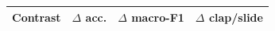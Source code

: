 \begin{tabular}{@{}lccc@{}}
\toprule
Contrast & $\Delta$ acc. & $\Delta$ macro-F1 & $\Delta$ clap/slide \\
\midrule
\bottomrule
\end{tabular}
